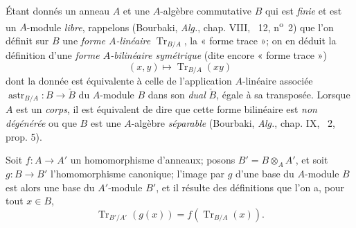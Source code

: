 
\begin{env}[18.2.1]
Étant donnés un anneau $A$ et une $A$-algèbre commutative $B$ qui est \emph{finie} et est un $A$-module \emph{libre}, rappelons (Bourbaki, \emph{Alg.}, chap. VIII, \textsection~12, n\textsuperscript{o}~2) que l'on définit sur $B$ une \emph{forme $A$-linéaire} $\operatorname{Tr}_{B/A}$, la « forme trace »; on en déduit la définition d'une \emph{forme $A$-bilinéaire symétrique} (dite encore « forme trace »)
\begin{equation}
  (x,y)\longmapsto\operatorname{Tr}_{B/A}(xy)
  \tag{18.2.1.1}\label{IV.18.2.1.1}
\end{equation}
dont la donnée est équivalente à celle de l'application $A$-linéaire associée $\operatorname{astr}_{B/A}:B\to\check B$ du $A$-module $B$ dans son \emph{dual} $\check B$, égale à sa transposée. Lorsque $A$ est un \emph{corps}, il est équivalent de dire que cette forme bilinéaire est \emph{non dégénérée} ou que $B$ est une $A$-algèbre \emph{séparable} (Bourbaki, \emph{Alg.}, chap. IX, \textsection~2, prop. 5).

Soit $f:A\to A'$ un homomorphisme d'anneaux; posons $B'=B\otimes_A A'$, et soit $g:B\to B'$ l'homomorphisme canonique; l'image par $g$ d'une base du $A$-module $B$ est alors une base du $A'$-module $B'$, et il résulte des définitions que l'on a, pour tout $x\in B$,
\begin{equation}
  \operatorname{Tr}_{B'/A'}(g(x))=f(\operatorname{Tr}_{B/A}(x)).
  \tag{18.2.1.2}\label{IV.18.2.1.2}
\end{equation}
\end{env}

